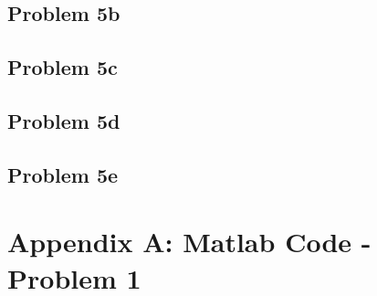 \subsection*{Problem 5b}

\subsection*{Problem 5c}

\subsection*{Problem 5d}

\subsection*{Problem 5e}






\newpage
\section*{Appendix A:  Matlab Code - Problem 1}

